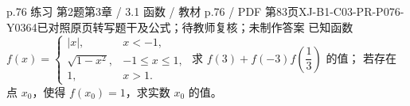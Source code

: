 \par\noindent\begin{minipage}{\linewidth}
\begin{bankitem}{p.76 练习 第2题}{第3章 / 3.1 函数 / 教材 p.76 / PDF 第83页}{XJ-B1-C03-PR-P076-Y0364}{已对照原页转写题干及公式；待教师复核；未制作答案}
已知函数 $f(x)=\begin{cases}|x|,&x<-1,\\\sqrt{1-x^2},&-1\le x\le1,\\1,&x>1.\end{cases}$
求 $f(3)+f(-3)f\left(\dfrac13\right)$ 的值；
若存在点 $x_0$，使得 $f(x_0)=1$，求实数 $x_0$ 的值。
\end{bankitem}
\end{minipage}\par\medskip
